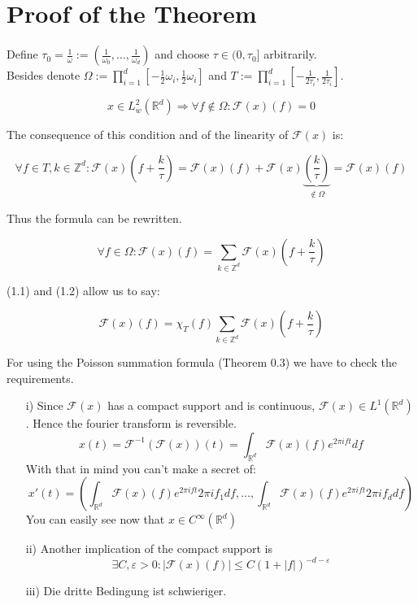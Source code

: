 \documentclass[a4paper, 11pt]{scrreprt}
\newcommand{\RR}{\mathbb{R}}
\newcommand{\ZZ}{\mathbb{Z}}
\newcommand{\FF}{\mathcal{F}}
\begin{document}
\section{Proof of the Theorem}
Define \(\tau_0 = \frac{1}{\omega} := \left(\frac{1}{\omega_0}, \ldots, \frac{1}{\omega_d}\right)\) and choose \(\tau \in (0,\tau_0]\) arbitrarily. \\
Besides denote \(\Omega := \prod_{i=1}^d \left[-\frac{1}{2}\omega_i ,\frac{1}{2}\omega_i\right]\) and \(T := \prod_{i=1}^d \left[-\frac{1}{2\tau_i} ,\frac{1}{2\tau_i}\right]\).

\begin{equation}
x \in L^2_w(\RR^d) \Rightarrow \forall f\notin \Omega: \FF(x)(f) = 0
\end{equation}

The consequence of this condition and of the linearity of \(\FF(x)\) is:

\[\forall f\in T, k \in \ZZ^d: \FF(x)\left(f+\frac{k}{\tau}\right) = \FF(x)(f) + \FF(x)\underbrace{\left(\frac{k}{\tau}\right)}_{\notin \Omega} = \FF(x)(f)\]

Thus the formula can be rewritten.

\begin{equation}
\forall f \in \Omega: \FF(x)(f) = \sum_{k \in \ZZ^d} \FF(x)\left( f+\frac{k}{\tau}\right)
\end{equation} 

(1.1) and (1.2) allow us to say:

\[\FF(x)(f) = \chi_{T}(f) \sum_{k \in \ZZ^d} \FF(x)\left(f+\frac{k}{\tau}\right)\]

For using the Poisson summation formula (Theorem 0.3) we have to check the requirements.

\begin{itemize}
	\item[i)] Since \(\FF(x)\) has a compact support and is continuous, \(\FF(x) \in L^1(\RR^d)\). Hence the fourier transform is reversible.
	 \[x(t) = \FF^{-1}(\FF(x))(t) = \int_{\RR^d}\FF(x)(f) e^{2 \pi i f t} df\]
	 With that in mind you can't make a secret of:
	 \[x'(t) = \left(\int_{\RR^d} \FF(x)(f) e^{2 \pi i f t} 2 \pi i f_1 df, \ldots, \int_{\RR^d} \FF(x)(f) e^{2 \pi i f t} 2 \pi i f_d df \right)\]
	 You can easily see now that \(x \in C^\infty(\RR^d)\)
	 \item[ii)] Another implication of the compact support is \[\exists C,\varepsilon>0: |\FF(x)(f)| \le C (1+|f|)^{-d-\varepsilon}\]
	 \item[iii)] Die dritte Bedingung ist schwieriger.
\end{itemize}
\end{document}
